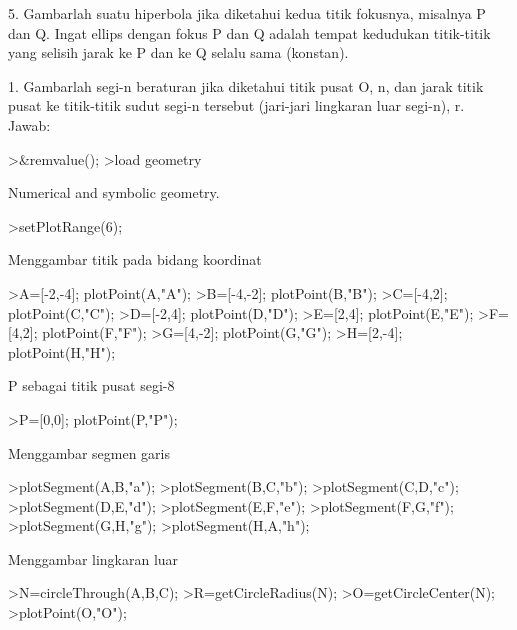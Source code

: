 \documentclass{article}
\begin{document}
\begin{eulernotebook}
\begin{eulercomment}
\begin{eulercomment}
\begin{eulercomment}
\begin{eulercomment}
\begin{eulercomment}
5. Gambarlah suatu hiperbola jika diketahui kedua titik fokusnya, misalnya P dan Q. Ingat
ellips dengan fokus P dan Q adalah tempat kedudukan titik-titik yang selisih jarak ke P dan
ke Q selalu sama (konstan).
\end{eulercomment}
\begin{eulercomment}
1. Gambarlah segi-n beraturan jika diketahui titik pusat O, n, dan
jarak titik pusat ke titik-titik sudut segi-n tersebut (jari-jari
lingkaran luar segi-n), r.\\
Jawab:
\end{eulercomment}
\begin{eulerprompt}
>&remvalue();
>load geometry
\end{eulerprompt}
\begin{euleroutput}
  Numerical and symbolic geometry.
\end{euleroutput}
\begin{eulerprompt}
>setPlotRange(6);
\end{eulerprompt}
\begin{eulercomment}
Menggambar titik pada bidang koordinat
\end{eulercomment}
\begin{eulerprompt}
>A=[-2,-4]; plotPoint(A,"A");
>B=[-4,-2]; plotPoint(B,"B");
>C=[-4,2]; plotPoint(C,"C");
>D=[-2,4]; plotPoint(D,"D");
>E=[2,4]; plotPoint(E,"E");
>F=[4,2]; plotPoint(F,"F");
>G=[4,-2]; plotPoint(G,"G");
>H=[2,-4]; plotPoint(H,"H");
\end{eulerprompt}
\begin{eulercomment}
P sebagai titik pusat segi-8
\end{eulercomment}
\begin{eulerprompt}
>P=[0,0]; plotPoint(P,"P");
\end{eulerprompt}
\begin{eulercomment}
Menggambar segmen garis 
\end{eulercomment}
\begin{eulerprompt}
>plotSegment(A,B,"a");
>plotSegment(B,C,"b");
>plotSegment(C,D,"c");
>plotSegment(D,E,"d");
>plotSegment(E,F,"e");
>plotSegment(F,G,"f");
>plotSegment(G,H,"g");
>plotSegment(H,A,"h");
\end{eulerprompt}
\begin{eulercomment}
Menggambar lingkaran luar
\end{eulercomment}
\begin{eulerprompt}
>N=circleThrough(A,B,C);
>R=getCircleRadius(N);
>O=getCircleCenter(N);
>plotPoint(O,"O");

\end{eulerprompt}
\end{eulercomment}
\end{eulercomment}
\end{eulercomment}
\end{eulercomment}
\end{eulernotebook}
\end{document}
